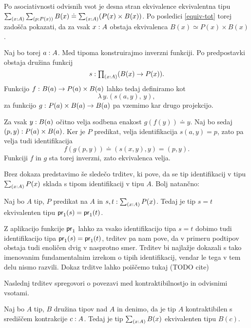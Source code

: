 \begin{dokaz}
  Po asociativnosti odvisnih vsot je desna stran ekvivalence ekvivalentna tipu
  \(\textstyle \sum_{\left( x : A \right)} \textstyle \sum_{\left( p : P(x) \right)} B(x) \doteq \textstyle \sum_{\left( x : A \right)} (P(x) \times B(x))\).
  Po posledici \ref{equiv-tot} torej zadošča pokazati, da za vsak \(x : A\)
  obstaja ekvivalenca \(B(x) \simeq P(x) \times B(x)\).

  Naj bo torej \(a : A\). Med tipoma konstruirajmo inverzni funkciji. Po predpostavki obstaja družina funkcij
  \[s : \textstyle \prod_{\left( x : A \right)} (B(x) \to P(x)).\]
  Funkcijo \(f \,\colon B(a) \to P(a) \times B(a)\) lahko tedaj definiramo kot
  \[\lambda \, y. \left(s(a,y),\, y\right),\] za funkcijo \(g \,\colon P(a) \times B(a) \to B(a)\) pa
  vzemimo kar drugo projekcijo.

  Za vsak \(y : B(a)\) očitno velja sodbena enakost \(g(f(y)) \doteq y\). Naj bo sedaj \((p, y) : P(a) \times B(a)\). Ker je \(P\)
  predikat, velja identifikacija \(s(a, y) = p\), zato pa velja tudi identifikacija
  \[f(g\left(p, y\right)) \doteq \left(s(x, y), y\right) = \left(p, y\right).\]
  Funkciji \(f\) in \(g\) sta torej inverzni, zato ekvivalenca velja.
\end{dokaz}

Brez dokaza predstavimo še sledečo trditev, ki pove, da se tip identifikacij v tipu \(\textstyle \sum_{\left( x : A \right)} P(x)\) sklada s tipom identifikacij v tipu \(A\). Bolj natančno:

\begin{trditev}
  \label{subtype-id}
  Naj bo \(A\) tip, \(P\) predikat na \(A\) in
  \(s, t : \textstyle \sum_{\left( x : A \right)} P(x)\). Tedaj je tip \(s = t\) ekvivalenten tipu \(\textnormal{\textsf{pr}}_{1}(s) = \textnormal{\textsf{pr}}_{1}(t)\).
\end{trditev}
Z aplikacijo funkcije \(\textnormal{\textsf{pr}}_{1}\) lahko za vsako identifikacijo tipa \(s = t\) dobimo tudi identifikacijo tipa \(\textnormal{\textsf{pr}}_{1}(s) = \textnormal{\textsf{pr}}_{1}(t)\), trditev pa nam pove, da v primeru podtipov obstaja tudi enoličen dvig v nasprotno smer.
Trditev bi najlažje dokazali s tako imenovanim fundamentalnim izrekom o tipih identifikacij, vendar le tega v tem delu nismo razvili. Dokaz trditve lahko poiščemo tukaj (TODO cite)

Naslednj trditev spregovori o povezavi med kontraktibilnostjo in odvisnimi vsotami.

\begin{trditev}
  \label{sigma-contr-base}
  Naj bo \(A\) tip, \(B\) družina tipov nad \(A\) in denimo, da je tip \(A\) kontraktibilen s središčem kontrakcije \(c : A\). Tedaj je tip \(\textstyle \sum_{\left( x : A \right)} B(x)\) ekvivalenten tipu \(B(c)\).
\end{trditev}

